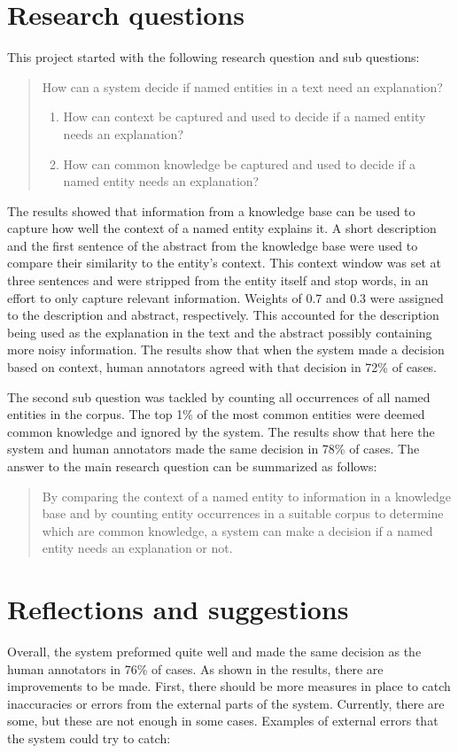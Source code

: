 \documentclass[
10pt, %
a4paper, %
oneside, %
headinclude,footinclude, %
] {book}%
\begin{document}
\section{Research questions}
This project started with the following research question and sub questions:
\begin{quote}
  How can a system decide if named entities in a text need an explanation?
  \begin{enumerate}
    \item How can context be captured and used to decide if a named entity needs an explanation?
    \item How can common knowledge be captured and used to decide if a named entity needs an explanation?
  \end{enumerate}
\end{quote}

The results showed that information from a knowledge base can be used to capture how well the context of a named entity explains it.
A short description and the first sentence of the abstract from the knowledge base were used to compare their similarity to the entity's context.
This context window was set at three sentences and were stripped from the entity itself and stop words, in an effort to only capture relevant information.
Weights of 0.7 and 0.3 were assigned to the description and abstract, respectively.
This accounted for the description being used as the explanation in the text and the abstract possibly containing more noisy information.
The results show that when the system made a decision based on context, human annotators agreed with that decision in 72\% of cases.

The second sub question was tackled by counting all occurrences of all named entities in the corpus.
The top 1\% of the most common entities were deemed common knowledge and ignored by the system.
The results show that here the system and human annotators made the same decision in 78\% of cases.
The answer to the main research question can be summarized as follows:

\begin{quote}
  By comparing the context of a named entity to information in a knowledge base and by counting entity occurrences in a suitable corpus to determine which are common knowledge, a system can make a decision if a named entity needs an explanation or not.
\end{quote}

\section{Reflections and suggestions}
Overall, the system preformed quite well and made the same decision as the human annotators in 76\% of cases.
As shown in the results, there are improvements to be made.
First, there should be more measures in place to catch inaccuracies or errors from the external parts of the system.
Currently, there are some, but these are not enough in some cases.
Examples of external errors that the system could try to catch:
\end{document}
